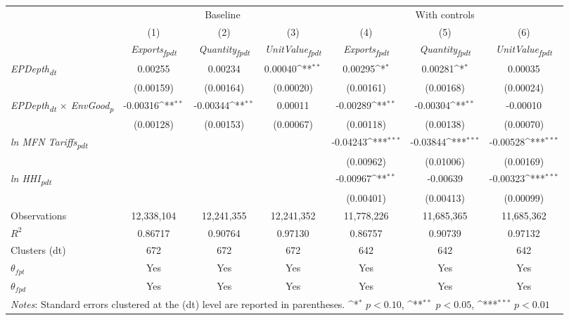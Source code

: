 {
\def\sym#1{\ifmmode^{#1}\else\(^{#1}\)\fi}
\begin{tabular}{l*{6}{c}}
\toprule
&\multicolumn{3}{c}{Baseline}&\multicolumn{3}{c}{With controls}\\\cmidrule(lr){2-4}\cmidrule(lr){5-7}
&(1)&(2)&(3)&(4)&(5)&(6)\\
&\textit{Exports\textsubscript{fpdt}}&\textit{Quantity\textsubscript{fpdt}}&\textit{UnitValue\textsubscript{fpdt}}&\textit{Exports\textsubscript{fpdt}}&\textit{Quantity\textsubscript{fpdt}}&\textit{UnitValue\textsubscript{fpdt}}\\
\midrule
\textit{EPDepth\textsubscript{dt}} & 0.00255 & 0.00234 & 0.00040\sym{**} & 0.00295\sym{*} & 0.00281\sym{*} & 0.00035\\
 & (0.00159) & (0.00164) & (0.00020) & (0.00161) & (0.00168) & (0.00024)\\
\addlinespace
\textit{EPDepth\textsubscript{dt} $\times$ EnvGood\textsubscript{p}} & -0.00316\sym{**} & -0.00344\sym{**} & 0.00011 & -0.00289\sym{**} & -0.00304\sym{**} & -0.00010\\
 & (0.00128) & (0.00153) & (0.00067) & (0.00118) & (0.00138) & (0.00070)\\
\addlinespace
\textit{ln MFN Tariffs\textsubscript{pdt}} &  &  &  & -0.04243\sym{***} & -0.03844\sym{***} & -0.00528\sym{***}\\
 &  &  &  & (0.00962) & (0.01006) & (0.00169)\\
\addlinespace
\textit{ln HHI\textsubscript{pdt}} &  &  &  & -0.00967\sym{**} & -0.00639 & -0.00323\sym{***}\\
 &  &  &  & (0.00401) & (0.00413) & (0.00099)\\
\midrule
Observations & 12,338,104 & 12,241,355 & 12,241,352 & 11,778,226 & 11,685,365 & 11,685,362\\
$R^{2}$ & 0.86717 & 0.90764 & 0.97130 & 0.86757 & 0.90739 & 0.97132\\
Clusters (dt) & 672 & 672 & 672 & 642 & 642 & 642\\
$\theta_{fpt}$ & Yes & Yes & Yes & Yes & Yes & Yes\\
$\theta_{fpd}$ & Yes & Yes & Yes & Yes & Yes & Yes\\
\bottomrule
\multicolumn{7}{l}{\footnotesize \textit{Notes}: Standard errors clustered at the (dt) level are reported in parentheses. \sym{*} \(p<0.10\), \sym{**} \(p<0.05\), \sym{***} \(p<0.01\)}\\
\end{tabular}
}
